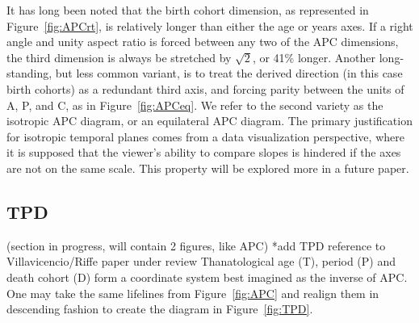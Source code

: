 \documentclass[11pt,oneside,a4paper]{article} %
\newcommand\tgh[1]{\raisebox{-.25\height}{\texttt{[image: Figures/triadtable/triad\#1.pdf]}}}
\begin{document}
It has long been noted \citep{zeuner1869abhandlungen, perozzo1880della} that the
birth cohort dimension, as represented in Figure~\ref{fig:APCrt}, is relatively
longer than either the age or years axes. If a right angle and unity aspect
ratio is forced between any two of the APC dimensions, the third dimension is always be
stretched by $\sqrt{2}$, or 41\% longer. Another long-standing, but less
common variant, is to treat the derived direction (in this case birth cohorts)
as a redundant third axis, and forcing parity between the units of A, P, and C, as in
Figure~\ref{fig:APCeq}. We refer to the second variety as the isotropic APC
diagram, or an equilateral APC diagram. The primary justification for isotropic
temporal planes comes from a data visualization perspective, where it is
supposed that the viewer's ability to compare slopes is hindered if the axes are
not on the same scale. This property will be explored more in a future paper.


\FloatBarrier

\subsection*{TPD}%
(section in progress, will contain 2 figures, like APC)
*add TPD reference to Villavicencio/Riffe paper under review
Thanatological age (T), period (P) and death cohort (D) form a coordinate system
best imagined as the inverse of APC. One may take the same lifelines from
Figure~\ref{fig:APC} and realign them in descending fashion to create the
diagram in Figure~\ref{fig:TPD}.
\end{document}
